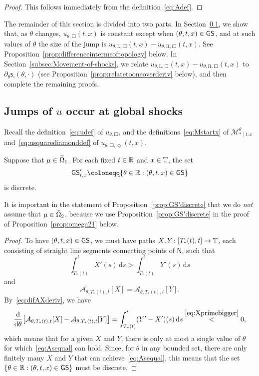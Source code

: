 \documentclass[AHL,Unicode,longabstracts]{cedram}
\newcommand*\GS{\mathsf{GS}}
\newcommand*\ssN{\mathsf{N}}
\newcommand*\sfs{\mathsf{s}}
\newcommand*\scM{\mathscr{M}}
\newcommand*\TT{\mathbb{T}}
\newcommand*\RR{\mathbb{R}}
\newcommand{\clA}{\mathcal{A}}
\newcommand*\st{\mathrel{:}}
\newcommand*\dif{\mathrm{d}}
\newcommand*\Left{\mathrm{L}}
\newcommand*\Right{\mathrm{R}}
\renewcommand*{\to}{\mathchoice{\longrightarrow}{\rightarrow}{\rightarrow}{\rightarrow}}
\let\oldin\in
\renewcommand{\in}{\mathchoice{\oldin}{\oldin}{\,\oldin\,}{\,\oldin\,}}
\let\originalleft\left
\let\originalright\right
\renewcommand{\left}{\mathopen{}\mathclose\bgroup\originalleft}
\renewcommand{\right}{\aftergroup\egroup\originalright}
\newcommand*\TT{\mathbb{T}}
\newcommand*\RR{\mathbb{R}}
\begin{document}
\begin{proof}
This follows immediately from the definition~\eqref{eq:Adef}.
\end{proof}

The remainder of this section is divided into two parts. In Section~\ref{subsec:only-change-at-global-shock}, we show that, as $\theta$ changes, $u_{\theta,\Square}(t,x)$ is constant except when $(\theta,t,x)\in\GS$, and at such values of $\theta$ the size of the jump is $u_{\theta,\Left,\Square}(t,x)-u_{\theta,\Right,\Square}(t,x)$. See Proposition~\ref{prop:differenceintermsoftopology} below. In Section~\ref{subsec:Movement-of-shocks}, we relate $u_{\theta,\Left,\Square}(t,x)-u_{\theta,\Right,\Square}(t,x)$ to $\partial_{\theta}\sfs_{\square}(\theta,\cdot)$ (see Proposition~\ref{prop:relatetooneoverderiv} below), and then complete the remaining proofs.


\subsection{Jumps of \texorpdfstring{$u$}{u} occur at global shocks}
\label{subsec:only-change-at-global-shock}

Recall the definition~\eqref{eq:udef} of $u_{\theta,\Square}$, and the definitions~\eqref{eq:Mstartx} of $\scM_{*\mid t,x}^{\theta}$ and~\eqref{eq:usquarediamonddef} of $u_{\theta,\Square,\Diamond}(t,x)$.
\begin{prop}\label{prop:GS'discrete}
Suppose that $\mu\in\widetilde{\Omega}_{1}$. For each fixed $t\in\RR$ and $x\in\TT$, the set
\begin{equation}\label{eq:GS'def}
\GS'_{t,x}\coloneqq\{\theta\in\RR\st(\theta,t,x)\in\GS\}
\end{equation}
is discrete.
\end{prop}

It is important in the statement of Proposition~\ref{prop:GS'discrete} that we do \emph{not} assume that $\mu\in\widetilde{\Omega}_{2}$, because we use Proposition~\ref{prop:GS'discrete} in the proof of Proposition~\ref{prop:omega21} below.
\begin{proof}
To have $(\theta,t,x)\in\GS$, we must have paths $X,Y\colon[T_{*}(t),t]\to\TT$, each consisting of straight line segments connecting points of $\ssN$, such that
\begin{equation}\label{eq:Xprimebigger}
\int_{T_{*}(t)}^{t}X'(s)\,\dif s>\int_{T_{*}(t)}^{t}Y'(s)\,\dif s
\end{equation}
and
\begin{equation}\label{eq:Asequal}
\clA_{\theta,T_{*}(t),t}[X]=\clA_{\theta,T_{*}(t),t}[Y].
\end{equation}
By~\eqref{eq:difAXderiv}, we have
\[
\frac{\dif}{\dif\theta}\left[\clA_{\theta,T_{*}(t),t}[X]-\clA_{\theta,T_{*}(t),t}[Y]\right]=\int_{T_{*}(t)}^{t}(Y'-X')(s)\,\dif s\overset{\eqref{eq:Xprimebigger}}{<}0,
\]
which means that for a given $X$ and $Y$, there is only at most a single value of $\theta$ for which~\eqref{eq:Asequal} can hold. Since, for $\theta$ in any bounded set, there are only finitely many $X$ and $Y$ that can achieve~\eqref{eq:Asequal}, this means that the set $\{\theta\in\RR\st(\theta,t,x)\in\GS\}$ must be discrete.
\end{proof}
\end{document}
